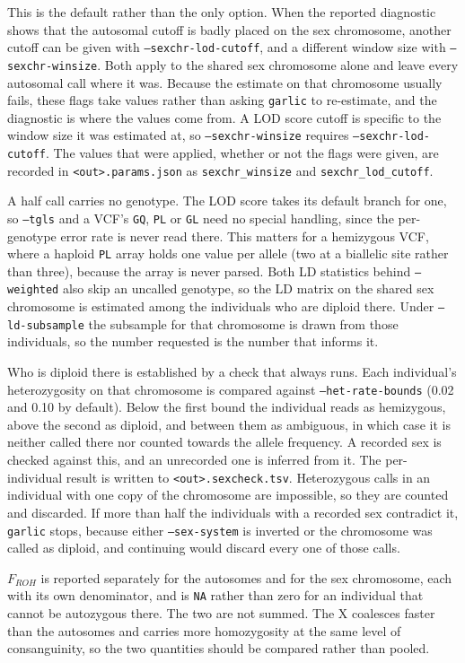 \documentclass[12pt]{article}%
\begin{document}
This is the default rather than the only option.  When the reported diagnostic
shows that the autosomal cutoff is badly placed on the sex chromosome, another
cutoff can be given with {\tt --sexchr-lod-cutoff}, and a different window
size with {\tt --sexchr-winsize}.  Both apply to the shared sex chromosome
alone and leave every autosomal call where it was.  Because the estimate on
that chromosome usually fails, these flags take values rather than asking
{\tt garlic} to re-estimate, and the diagnostic is where the values come from.
A LOD score cutoff is specific to the window size it was estimated at, so
{\tt --sexchr-winsize} requires {\tt --sexchr-lod-cutoff}.  The values that
were applied, whether or not the flags were given, are recorded in
{\tt <out>.params.json} as {\tt sexchr\_winsize} and {\tt sexchr\_lod\_cutoff}.

A half call carries no genotype.  The LOD score takes its default branch for
one, so {\tt --tgls} and a VCF's {\tt GQ}, {\tt PL} or {\tt GL} need no special
handling, since the per-genotype error rate is never read there.  This matters
for a hemizygous VCF, where a haploid {\tt PL} array holds one value per allele
(two at a biallelic site rather than three), because the array is never
parsed.  Both LD statistics behind {\tt --weighted} also skip an uncalled
genotype, so the LD matrix on the shared sex chromosome is estimated among the
individuals who are diploid there.  Under {\tt --ld-subsample} the subsample
for that chromosome is drawn from those individuals, so the number requested is
the number that informs it.

Who is diploid there is established by a check that always runs.  Each
individual's heterozygosity on that chromosome is compared against
{\tt --het-rate-bounds} (0.02 and 0.10 by default).  Below the first bound the
individual reads as hemizygous, above the second as diploid, and between them
as ambiguous, in which case it is neither called there nor counted towards the
allele frequency.  A recorded sex is checked against this, and an unrecorded
one is inferred from it.  The per-individual result is written to
{\tt <out>.sexcheck.tsv}.  Heterozygous calls in an individual with one copy of
the chromosome are impossible, so they are counted and discarded.  If more
than half the individuals with a recorded sex contradict it, {\tt garlic}
stops, because either {\tt --sex-system} is inverted or the chromosome was
called as diploid, and continuing would discard every one of those calls.

$F_{ROH}$ is reported separately for the autosomes and for the sex chromosome,
each with its own denominator, and is {\tt NA} rather than zero for an
individual that cannot be autozygous there.  The two are not summed.  The X
coalesces faster than the autosomes and carries more homozygosity at the same
level of consanguinity, so the two quantities should be compared rather than
pooled.
\end{document}
